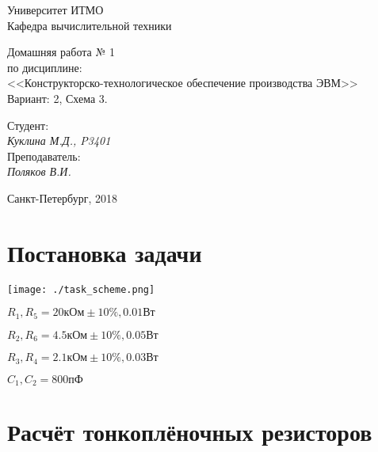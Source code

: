 \documentclass[12pt, a4paper] {ncc}
\begin{document}
\setcounter{figure}{0}
\frenchspacing
\pagestyle{empty}


\begin{center}
                            Университет ИТМО    \\
                        Кафедра вычислительной техники


\end{center}
\begin{center}
						Домашняя работа № 1 \\
				по дисциплине: \\
	<<Конструкторско-технологическое обеспечение производства ЭВМ>> \\
                    Вариант: 2, Схема 3.
\end{center}
\begin{flushright}
                                    Студент:\\
                                    {\it Куклина М.Д., P3401}\\
                                    Преподаватель: \\
                                    {\it Поляков В.И.}
\end{flushright}
\begin{center}
                             Санкт-Петербург, 2018
\end{center}
\newpage

\section{Постановка задачи}

	\texttt{[image: ./task\_scheme.png]}

	$R_1, R_5 = 20 \text{кОм} \pm 10 \%, 0.01 \text{Вт}$

	$R_2, R_6 = 4.5 \text{кОм} \pm 10 \%, 0.05 \text{Вт}$

	$R_3, R_4 = 2.1 \text{кОм} \pm 10 \%, 0.03 \text{Вт}$

	$C_1, C_2 = 800 \text{пФ}$

\section{Расчёт тонкоплёночных резисторов}
\end{document}

